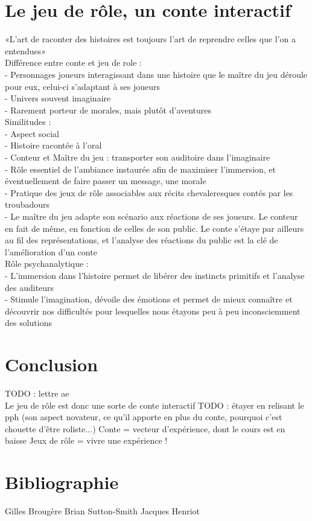 \documentclass[a4paper,12pt,final,oneside]{article}
\begin{document}
\clearpage

\section{Le jeu de rôle, un conte interactif}
«L'art de raconter des histoires est toujours l'art de reprendre celles que l'on a entendues»\\

Différence entre conte et jeu de role : \\
- Personnages joueurs interagissant dans une histoire que le maître du jeu déroule pour eux, celui-ci s'adaptant à ses joueurs\\
- Univers souvent imaginaire\\
- Rarement porteur de morales, mais plutôt d'aventures\\


Similitudes :\\
- Aspect social\\
- Histoire racontée à l'oral\\
- Conteur et Maître du jeu : transporter son auditoire dans l'imaginaire\\
- Rôle essentiel de l'ambiance instaurée afin de maximiser l'immersion, et éventuellement de faire passer un message, une morale\\
- Pratique des jeux de rôle associables aux récits chevaleresques contés par les troubadours\\
- Le maître du jeu adapte son scénario aux réactions de ses joueurs. Le conteur en fait de même, en fonction de celles de son public. Le conte s'étaye par ailleurs au fil des représentations, et l'analyse des réactions du public est la clé de l'amélioration d'un conte\\

Rôle psychanalytique :\\
- L'immersion dans l'histoire permet de libérer des instincts primitifs et l'analyse des auditeurs\\
- Stimule l'imagination, dévoile des émotions et permet de mieux connaître et découvrir nos difficultés pour lesquelles nous étayons peu à peu inconsciemment des solutions\\

\clearpage



\section{Conclusion}
TODO : lettre ae\\
Le jeu de rôle est donc une sorte de conte interactif
TODO : étayer en relisant le pph (son aspect novateur, ce qu'il apporte en plus du conte, pourquoi c'est chouette d'être roliste...)
Conte = vecteur d'expérience, dont le cours est en baisse
Jeux de rôle = vivre une expérience !
\clearpage

\section{Bibliographie}
\def\section*#1{} %


Gilles Brougère
Brian Sutton-Smith
Jacques Henriot
\end{document}

